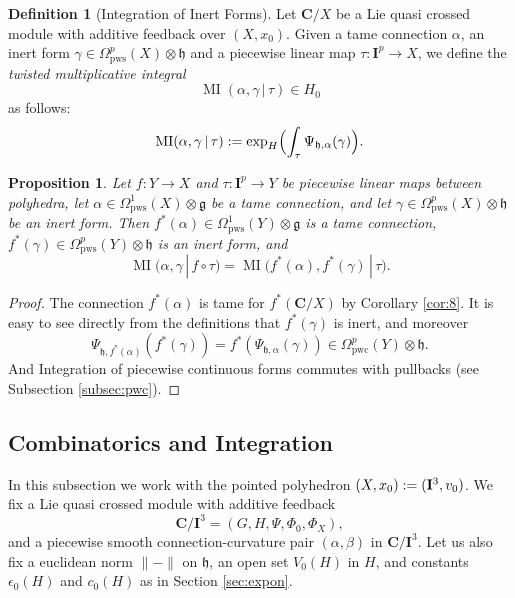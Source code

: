 \documentclass[10pt, a4paper]{amsart}
\newtheorem{prop}[equation]{Proposition}
\theoremstyle{definition}
\newtheorem{dfn}[equation]{Definition}
\numberwithin{equation}{section}
\newcommand{\opn}{\operatorname}
\newcommand{\mfrak}[1]{\mathfrak{#1}}
\newcommand{\mbf}[1]{\mathbf{#1}}
\newcommand{\mrm}[1]{\mathrm{#1}}
\newcommand{\norm}[1]{\lVert #1 \rVert}
\renewcommand{\vert}{\, | \,}
\newcommand{\g}{\mfrak{g}}
\newcommand{\h}{\mfrak{h}}
\newcommand{\lb}{\linebreak}
\begin{document}
\begin{dfn}[Integration of Inert Forms] \label{dfn:43}
Let  $\mbf{C} / X$ be a Lie quasi crossed module with additive feedback
over $(X, x_0)$. Given a tame connection $\alpha$, an inert form
$\gamma \in \Omega^p_{\mrm{pws}}(X) \otimes \h$ and a piecewise linear map
$\tau : \mbf{I}^p \to X$, we define the {\em twisted multiplicative integral}
\[ \opn{MI}(\alpha, \gamma \vert \tau) \in H_0 \] 
as follows: 
\[ \opn{MI}(\alpha, \gamma \vert \tau) :=
\exp_H \Bigl( \int_{\tau} \Psi_{\h, \alpha}(\gamma) \Bigr) . \]
\end{dfn}

\begin{prop} \label{prop:20}
Let $f : Y \to X$ and $\tau : \mbf{I}^p \to Y$ be piecewise linear maps
between polyhedra, let 
$\alpha \in \Omega^1_{\mrm{pws}}(X) \otimes \g$ 
be a tame connection, and let
$\gamma \in \Omega^p_{\mrm{pws}}(X) \otimes \h$ be an inert form. Then 
$f^*(\alpha) \in \Omega^1_{\mrm{pws}}(Y) \otimes \g$ 
is a tame connection, 
$f^*(\gamma) \in \Omega^p_{\mrm{pws}}(Y) \otimes \h$ is an inert form, and
\[ \opn{MI}(\alpha, \gamma \vert f \circ \tau) = 
\opn{MI} \bigl( f^*(\alpha), f^*(\gamma) \vert \tau \bigl) . \]
\end{prop}

\begin{proof}
The connection $f^*(\alpha)$ is tame for $f^*(\mbf{C} / X)$ by Corollary
\ref{cor:8}. It is easy to see directly from the definitions that $f^*(\gamma)$
is inert, and moreover 
\[ \Psi_{\h, f^*(\alpha)}(f^*(\gamma)) = 
f^*( \Psi_{\h, \alpha}(\gamma)) \in \Omega^p_{\mrm{pwc}}(Y) \otimes \h . \]
And Integration of piecewise continuous forms commutes with pullbacks (see
Subsection \ref{subsec:pwc}). 
\end{proof}




\subsection{Combinatorics and Integration} \label{subsec:combi3d}
In this subsection we work with the pointed polyhedron 
$(X, x_0) := \lb (\mbf{I}^3, v_0)$. We fix a Lie quasi crossed module
with additive feedback
\[ \mbf{C} / \mbf{I}^3 = (G, H, \Psi, \Phi_0, \Phi_X) , \] 
and a piecewise smooth connection-curvature pair 
$(\alpha, \beta)$ in $\mbf{C} / \mbf{I}^3$.
Let us also fix a euclidean norm $\norm{-}$ on $\h$, 
an open set $V_0(H)$ in $H$, and constants $\epsilon_0(H)$ and 
$c_0(H)$ as in Section \ref{sec:expon}.
\end{document}

